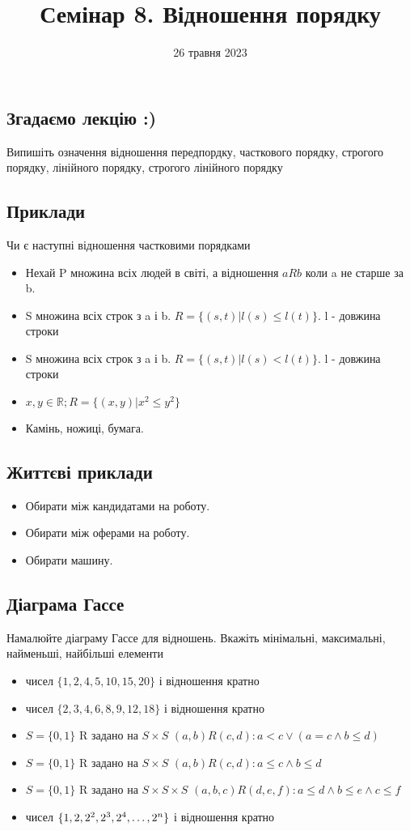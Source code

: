 \documentclass{article}
\begin{document}
\title{Семінар 8. Відношення порядку}
\date{26 травня 2023}

\maketitle

\subsection*{Згадаємо лекцію :)}
Випишіть означення відношення передпордку, часткового порядку, строгого порядку, лінійного порядку, строгого лінійного порядку

\subsection*{Приклади}
Чи є наступні відношення частковими порядками
\begin{itemize}
    \item Нехай P множина всіх людей в світі, а відношення $aRb$ коли a не старше за b.
    \item S множина всіх строк з a і b. $R=\{(s,t)|l(s) \leq l(t)\}$. l - довжина строки
    \item S множина всіх строк з a і b. $R=\{(s,t)|l(s) < l(t)\}$. l - довжина строки
    \item $x,y \in \mathbb{R}; R = \{(x,y)|x^2 \leq y^2\}$
    \item Камінь, ножиці, бумага.
\end{itemize}

\subsection*{Життєві приклади}
\begin{itemize}
    \item Обирати між кандидатами на роботу.
    \item Обирати між оферами на роботу.
    \item Обирати машину.
\end{itemize}

\subsection*{Діаграма Гассе}
Намалюйте діаграму Гассе для відношень. Вкажіть мінімальні, максимальні, найменьші, найбільші елементи
\begin{itemize}
    \item чисел $\{1,2,4,5,10,15,20\}$ і відношення кратно
    \item чисел $\{2,3,4,6,8,9,12,18\}$ і відношення кратно
    \item $S=\{0,1\}$ R задано на $S \times S$ $(a,b)R(c,d): a < c \lor (a=c \land b \leq d)$
    \item $S=\{0,1\}$ R задано на $S \times S$ $(a,b)R(c,d): a\leq c \land b \leq d$
    \item $S=\{0,1\}$ R задано на $S \times S \times S$ $(a,b,c)R(d,e,f): a\leq d \land b \leq e \land c \leq f$
    \item чисел $\{1,2,2^2,2^3,2^4,\mathellipsis,2^n\}$ і відношення кратно
\end{itemize}
\end{document}
